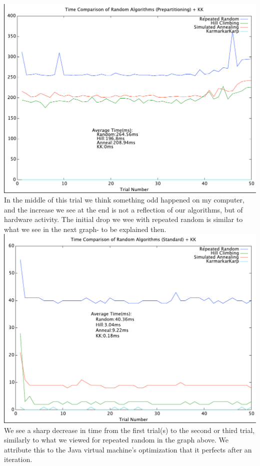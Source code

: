 \documentclass[12pt]{article}
\begin{document}
\includegraphics[scale=0.8]{false_time.pdf}
\noindent In the middle of this trial we think something odd happened on my computer, and the increase we see at the end is not a reflection of our algorithms, but of hardware activity.  The initial drop we wee with repeated random is similar to what we see in the next graph- to be explained then.
\\
\includegraphics[scale=0.8]{true_time.pdf}
\noindent We see a sharp decrease in time from the first trial(s) to the second or third trial, similarly to what we viewed for repeated random in the graph above.  We attribute this to the Java virtual machine's optimization that it perfects after an iteration.
\\
\end{document}

